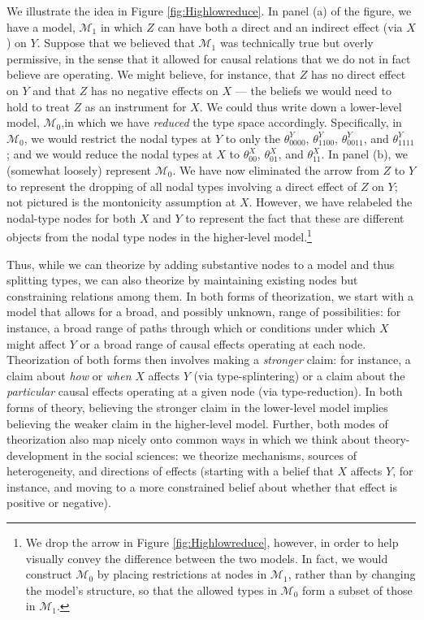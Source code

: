 \documentclass[
  12pt,
]{book}
\begin{document}
We illustrate the idea in Figure \ref{fig:Highlowreduce}. In panel (a) of the figure, we have a model, \(\mathcal M_1\) in which \(Z\) can have both a direct and an indirect effect (via \(X\)) on \(Y\). Suppose that we believed that \(\mathcal M_1\) was technically true but overly permissive, in the sense that it allowed for causal relations that we do not in fact believe are operating. We might believe, for instance, that \(Z\) has no direct effect on \(Y\) and that \(Z\) has no negative effects on \(X\) --- the beliefs we would need to hold to treat \(Z\) as an instrument for \(X\). We could thus write down a lower-level model, \(\mathcal M_0\),in which we have \emph{reduced} the type space accordingly. Specifically, in \(\mathcal M_0\), we would restrict the nodal types at \(Y\) to only the \(\theta^Y_{0000}\), \(\theta^Y_{1100}\), \(\theta^Y_{0011}\), and \(\theta^Y_{1111}\); and we would reduce the nodal types at \(X\) to \(\theta^X_{00}\), \(\theta^X_{01}\), and \(\theta^X_{11}\). In panel (b), we (somewhat loosely) represent \(\mathcal M_0\). We have now eliminated the arrow from \(Z\) to \(Y\) to represent the dropping of all nodal types involving a direct effect of \(Z\) on \(Y\); not pictured is the montonicity assumption at \(X\). However, we have relabeled the nodal-type nodes for both \(X\) and \(Y\) to represent the fact that these are different objects from the nodal type nodes in the higher-level model.\footnote{We drop the arrow in Figure \ref{fig:Highlowreduce}, however, in order to help visually convey the difference between the two models. In fact, we would construct \(\mathcal M_0\) by placing restrictions at nodes in \(\mathcal M_1\), rather than by changing the model's structure, so that the allowed types in \(\mathcal M_0\) form a subset of those in \(\mathcal M_1\).}

Thus, while we can theorize by adding substantive nodes to a model and thus splitting types, we can also theorize by maintaining existing nodes but constraining relations among them. In both forms of theorization, we start with a model that allows for a broad, and possibly unknown, range of possibilities: for instance, a broad range of paths through which or conditions under which \(X\) might affect \(Y\) or a broad range of causal effects operating at each node. Theorization of both forms then involves making a \emph{stronger} claim: for instance, a claim about \emph{how} or \emph{when} \(X\) affects \(Y\) (via type-splintering) or a claim about the \emph{particular} causal effects operating at a given node (via type-reduction). In both forms of theory, believing the stronger claim in the lower-level model implies believing the weaker claim in the higher-level model. Further, both modes of theorization also map nicely onto common ways in which we think about theory-development in the social sciences: we theorize mechanisms, sources of heterogeneity, and directions of effects (starting with a belief that \(X\) affects \(Y\), for instance, and moving to a more constrained belief about whether that effect is positive or negative).
\end{document}
